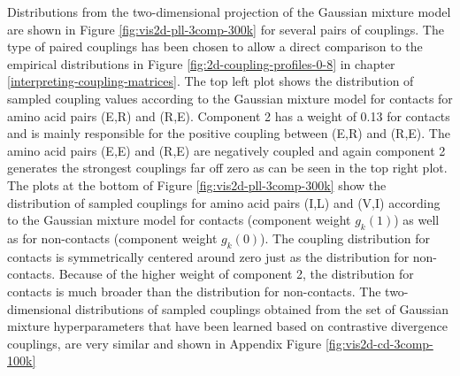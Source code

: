 \documentclass[11pt,a4paper,twoside]{book}
\theoremstyle{definition}
\theoremstyle{definition}
\theoremstyle{remark}
\begin{document}
Distributions from the two-dimensional projection of the Gaussian
mixture model are shown in Figure \ref{fig:vis2d-pll-3comp-300k} for
several pairs of couplings. The type of paired couplings has been chosen
to allow a direct comparison to the empirical distributions in Figure
\ref{fig:2d-coupling-profiles-0-8} in chapter
\ref{interpreting-coupling-matrices}. The top left plot shows the
distribution of sampled coupling values according to the Gaussian
mixture model for contacts for amino acid pairs (E,R) and (R,E).
Component 2 has a weight of 0.13 for contacts and is mainly responsible
for the positive coupling between (E,R) and (R,E). The amino acid pairs
(E,E) and (R,E) are negatively coupled and again component 2 generates
the strongest couplings far off zero as can be seen in the top right
plot. The plots at the bottom of Figure \ref{fig:vis2d-pll-3comp-300k}
show the distribution of sampled couplings for amino acid pairs (I,L)
and (V,I) according to the Gaussian mixture model for contacts
(component weight \(g_k(1)\)) as well as for non-contacts (component
weight \(g_k(0)\)). The coupling distribution for contacts is
symmetrically centered around zero just as the distribution for
non-contacts. Because of the higher weight of component 2, the
distribution for contacts is much broader than the distribution for
non-contacts. The two-dimensional distributions of sampled couplings
obtained from the set of Gaussian mixture hyperparameters that have been
learned based on contrastive divergence couplings, are very similar and
shown in Appendix Figure \ref{fig:vis2d-cd-3comp-100k}
\end{document}
